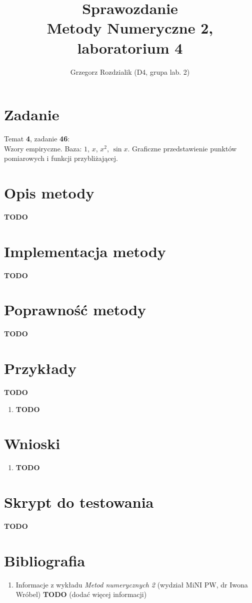 \documentclass[12pt]{article}
\begin{document}
	\title{Sprawozdanie\\Metody Numeryczne 2, laboratorium 4}
	\author{Grzegorz Rozdzialik (D4, grupa lab. 2)}
	\maketitle	
	
	\section{Zadanie}
	{\Large Temat \textbf{4}, zadanie \textbf{46}:}\\
	Wzory empiryczne. Baza: $1$, $x$, $x^2$, $\sin x$. Graficzne przedstawienie punktów pomiarowych i funkcji przybliżającej.

	
	\section{Opis metody}
	\textbf{TODO}
	
	
	
	
	
	\section{Implementacja metody}
	\textbf{TODO}
	
	
	
	
	\section{Poprawność metody}
	\textbf{TODO}
	
	
	
	
	\section{Przykłady}
	\textbf{TODO}
	
	\begin{enumerate}[label=\textbf{Przykład \arabic*}]
		\item
		\textbf{TODO}
		
	\end{enumerate}
	
	
	
	
	
	
	\section{Wnioski}
	\begin{enumerate}
		\item \textbf{TODO}
	\end{enumerate}

	
	
	
	
	
	\section{Skrypt do testowania}
	\textbf{TODO}
	
	
	
	\section{Bibliografia}
	\begin{enumerate}
		\item Informacje z wykładu \textit{Metod numerycznych 2} (wydział MiNI PW, dr Iwona Wróbel) \textbf{TODO} (dodać więcej informacji)
	\end{enumerate}
	
\end{document}

